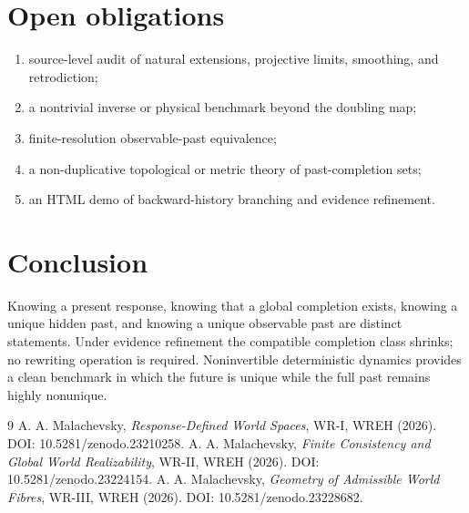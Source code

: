 \documentclass[11pt]{article}
\begin{document}
\section{Open obligations}
\begin{enumerate}
\item source-level audit of natural extensions, projective limits, smoothing, and retrodiction;
\item a nontrivial inverse or physical benchmark beyond the doubling map;
\item finite-resolution observable-past equivalence;
\item a non-duplicative topological or metric theory of past-completion sets;
\item an HTML demo of backward-history branching and evidence refinement.
\end{enumerate}

\section*{Conclusion}
Knowing a present response, knowing that a global completion exists, knowing a unique hidden past, and knowing a unique observable past are distinct statements. Under evidence refinement the compatible completion class shrinks; no rewriting operation is required. Noninvertible deterministic dynamics provides a clean benchmark in which the future is unique while the full past remains highly nonunique.

\begin{thebibliography}{9}
 A. A. Malachevsky, \emph{Response-Defined World Spaces}, WR-I, WREH (2026). DOI: 10.5281/zenodo.23210258.
 A. A. Malachevsky, \emph{Finite Consistency and Global World Realizability}, WR-II, WREH (2026). DOI: 10.5281/zenodo.23224154.
 A. A. Malachevsky, \emph{Geometry of Admissible World Fibres}, WR-III, WREH (2026). DOI: 10.5281/zenodo.23228682.
\end{thebibliography}
\end{document}
